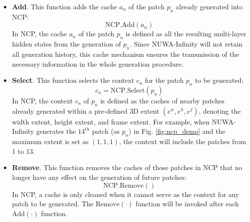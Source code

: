 \documentclass{article}
\begin{document}
\begin{itemize}[leftmargin=*]

\item \textbf{Add}. This function adds the cache $a_n$ of the patch $p_n$ already generated into NCP:
\begin{equation}\label{eq:ncpadd}
\text{NCP.Add}(a_n)
\end{equation}
In NCP, the cache $a_n$ of the patch $p_n$ is defined as all the resulting multi-layer hidden states from the generation of $p_n$. Since NUWA-Infinity will not retain all generation history, this cache mechanism ensures the transmission of the necessary information in the whole generation procedure.
\item \textbf{Select}. This function selects the context $c_n$ for the patch $p_n$ to be generated:\begin{equation}\label{eq:ncpselect}
c_n = \text{NCP.Select}(p_n)
\end{equation}
In NCP, the context $c_n$ of $p_n$ is defined as the caches of nearby patches already generated within a pre-defined 3D extent $(e^w, e^h, e^f)$, denoting the width extent, height extent, and frame extent. For example, when NUWA-Infinity generates the $14^{th}$ patch (as $p_n$) in Fig. \ref{fig:ncp_demo} and the maximum extent is set as $(1, 1, 1)$, the context will include the patches from 1 to 13.




\item \textbf{Remove}. This function removes the caches of those patches in NCP that no longer have any effect on the generation of future patches:
\begin{equation}\label{eq:ncpremove}
\text{NCP.Remove}()
\end{equation}
In NCP, a cache is only cleaned when it cannot serve as the context for any patch to be generated. The $\text{Remove}(\cdot)$ function will be invoked after each $\text{Add}(\cdot)$ function.

\end{itemize}
\end{document}
